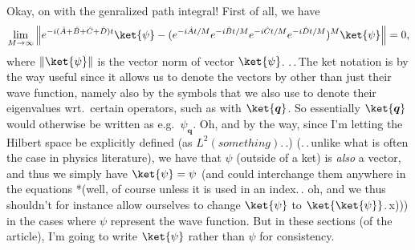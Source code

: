 \documentclass{report}
\begin{document}
Okay, on with the genralized path integral! First of all, we have
\begin{align}
\begin{aligned}
	\lim_{M \to \infty} \Big\|
		e^{-i (\hat A + \hat B + \hat C + \hat D) t } \ket{\psi} - (
			e^{-i \hat A t / M } e^{-i \hat B t / M}
			e^{-i \hat C t / M } e^{-i \hat D t / M}
		)^M \ket{\psi}
	\Big\| = 0,
	\label{Trotter_four_terms_01}
\end{aligned}
\end{align} 
where $\| \ket{\psi} \|$ is the vector norm of vector $\ket{\psi}$. .\,.\,The ket notation is by the way useful since it allows us to denote the vectors by other than just their wave function, namely also by the symbols that we also use to denote their eigenvalues wrt.\ certain operators, such as with $\ket{\boldsymbol q}$. So essentially $\ket{\boldsymbol q}$ would otherwise be written as e.g.\ $\psi_{\boldsymbol{q}}$. Oh, and by the way, since I'm letting the Hilbert space be explicitly defined (as $L^2(something)$.\,.) (.\,.\,unlike what is often the case in physics literature), we have that $\psi$ (outside of a ket) is \emph{also} a vector, and thus we simply have $\ket{\psi} = \psi$ (and could interchange them anywhere in the equations *(well, of course unless it is used in an index.\,. oh, and we thus shouldn't for instance allow ourselves to change $\ket{\psi}$ to $\ket{\ket{\psi}}$.\,x))) in the cases where $\psi$ represent the wave function. But in these sections (of the article), I'm going to write $\ket{\psi}$ rather than $\psi$ for consistency. 
\end{document}
